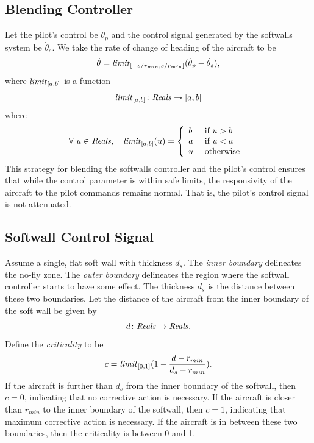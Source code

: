 \documentclass[11pt]{article}
\begin{document}
\subsection{Blending Controller}

Let the pilot's control be $\dot{\theta}_p$ and the control signal
generated by the softwalls system be $\dot{\theta}_s$.
We take the rate of change of heading of the aircraft to
be
\[
\dot{\theta} = \mbox{\textit{limit}}_{[-s/r_{min}, s/r_{min}]}
(\dot{\theta}_p - \dot{\theta}_s ),
\]
where $\mbox{\textit{limit}}_{[a,b]}$ is a function
\[
\mbox{\textit{limit}}_{[a,b]} \colon \mbox{\textit{Reals}} \to [a, b]
\]
where
\[
\forall ~ u \in \mbox{\textit{Reals}}, \quad
\mbox{\textit{limit}}_{[a,b]}(u) = \left \{
\begin{array}{ll}
b&\mbox{ if } u > b\\
a&\mbox{ if } u < a\\
u&\mbox{ otherwise }
\end{array}
\right .
\]
This strategy for blending the softwalls controller and the
pilot's control ensures that while the control parameter is within
safe limits, the responsivity of the aircraft to the pilot
commands remains normal.
That is, the pilot's control signal is not attenuated.

\subsection{Softwall Control Signal}

Assume a single, flat soft wall with thickness $d_s$.
The \textit{inner boundary} delineates the no-fly zone.
The \textit{outer boundary} delineates the region where the
softwall controller starts to have some effect.
The thickness $d_s$ is the distance between these two boundaries.
Let the distance of the aircraft from the inner boundary of
the soft wall be given by
\[
d \colon \mbox{\textit{Reals}} \to \mbox{\textit{Reals}} .
\]
Define the \textit{criticality} to be
\[
c = \mbox{\textit{limit}}_{[0,1]}(1 - {{d - r_{min}}\over{d_s - r_{min}}}) .
\]
If the aircraft is further than $d_s$ from the inner boundary of the
softwall, then $c = 0$, indicating that no corrective action is necessary.
If the aircraft is closer than $r_{min}$ to the inner boundary of the softwall,
then $c = 1$, indicating that maximum corrective action is necessary.
If the aircraft is in between these two boundaries, then the criticality
is between 0 and 1.
\end{document}
